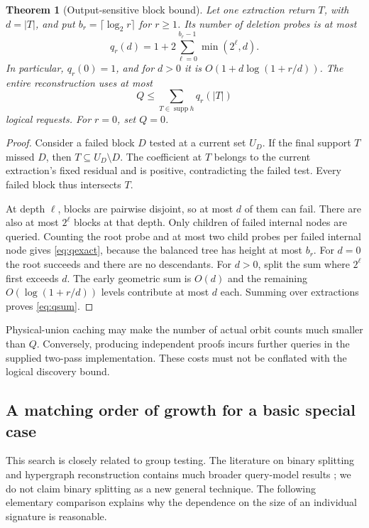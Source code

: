 \documentclass[11pt]{article}
\newtheorem{theorem}{Theorem}[section]
\theoremstyle{definition}
\newcommand{\supp}{\operatorname{supp}}
\begin{document}
\begin{theorem}[Output-sensitive block bound]
\label{thm:block}
Let one extraction return $T$, with $d=|T|$, and put
$b_r=\lceil\log_2 r\rceil$ for $r\geq1$. Its number of deletion probes is at most
\begin{equation}
 q_r(d)=1+2\sum_{\ell=0}^{b_r-1}\min(2^\ell,d).
 \label{eq:qexact}
\end{equation}
In particular, $q_r(0)=1$, and for $d>0$ it is
$O(1+d\log(1+r/d))$. The entire reconstruction uses at most
\begin{equation}
 Q\leq\sum_{T\in\supp h}q_r(|T|)
 \label{eq:qsum}
\end{equation}
logical requests. For $r=0$, set $Q=0$.
\end{theorem}
\begin{proof}
Consider a failed block $D$ tested at a current set $U_D$.
If the final support $T$ missed $D$, then
$T\subseteq U_D\setminus D$. The coefficient at $T$ belongs to the current
extraction's fixed residual and is positive, contradicting the failed test.
Every failed block thus intersects $T$.

At depth $\ell$, blocks are pairwise disjoint, so at most $d$ of them can
fail. There are also at most $2^\ell$ blocks at that depth. Only children
of failed internal nodes are queried. Counting the root probe and at most
two child probes per failed internal node gives \eqref{eq:qexact}, because
the balanced tree has height at most $b_r$. For $d=0$ the root succeeds and
there are no descendants. For $d>0$, split the sum where $2^\ell$ first
exceeds $d$. The early geometric sum is $O(d)$ and the remaining
$O(\log(1+r/d))$ levels contribute at most $d$ each. Summing over
extractions proves \eqref{eq:qsum}.
\end{proof}

Physical-union caching may make the number of actual orbit counts much
smaller than $Q$. Conversely, producing independent proofs incurs further
queries in the supplied two-pass implementation. These costs must not be
conflated with the logical discovery bound.

\subsection{A matching order of growth for a basic special case}
This search is closely related to group testing. The literature on binary
splitting and hypergraph reconstruction contains much broader query-model
results \cite{price-scarlett,bshouty-mazzawi}; we do not claim binary splitting
as a new general technique. The following elementary comparison explains
why the dependence on the size of an individual signature is reasonable.
\end{document}
